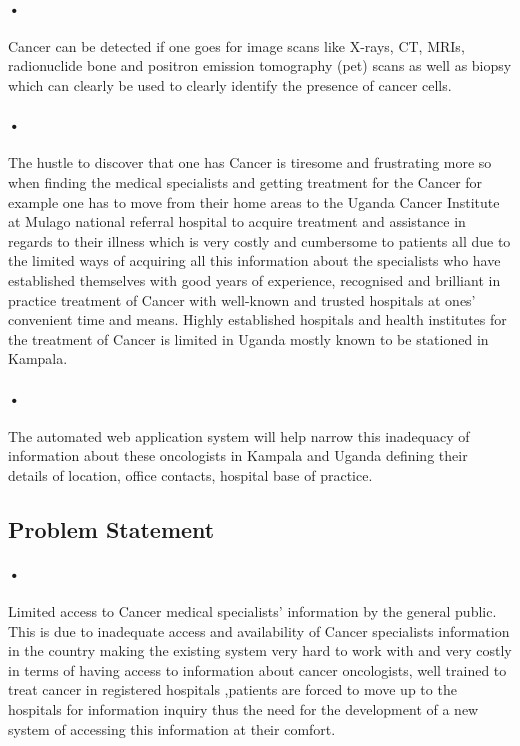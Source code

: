 \documentclass[12pt]{article}
\begin{document}
\paragraph{•}Cancer can be detected if one goes for image scans like X-rays, CT, MRIs, radionuclide bone and positron emission tomography (pet) scans as well as biopsy which can clearly be used to clearly identify the presence of cancer cells.

\paragraph{•}The hustle to discover that one has Cancer is tiresome and frustrating more so when finding the medical specialists and getting treatment for the Cancer for example one has to move from their home areas to the Uganda Cancer Institute at Mulago national referral hospital to acquire treatment and assistance in regards to their illness which is very costly and cumbersome to patients all due to the limited ways of acquiring all this information about the specialists who have established themselves with good years of experience, recognised and brilliant in practice treatment of Cancer with well-known and trusted hospitals at ones’ convenient time and means. Highly established hospitals and health institutes for the treatment of Cancer is limited in Uganda mostly known to be stationed in Kampala.

\paragraph{•}The automated web application system will help narrow this inadequacy of information about these oncologists in Kampala and Uganda defining their details of location, office contacts, hospital base of practice.

\subsection{Problem Statement}
\paragraph{•}Limited access to Cancer medical specialists’ information by the general public. This is due to inadequate access and availability of Cancer specialists information in the country making the existing system very hard to work with and very costly in terms of having access to information about cancer oncologists, well trained to treat cancer in registered hospitals  ,patients are forced to move up to the hospitals for information inquiry thus the need for the development of a new system of accessing this information at their comfort.
\end{document}
